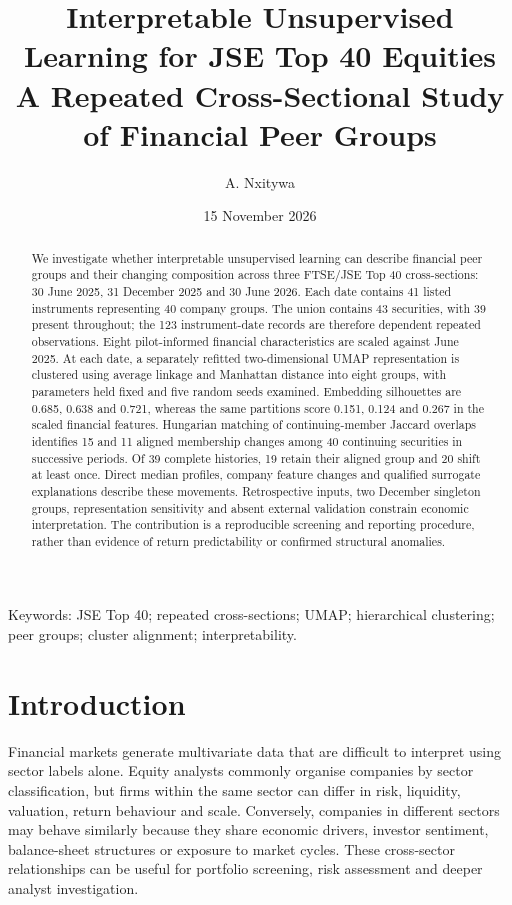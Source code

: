 

\title{Interpretable Unsupervised Learning for JSE Top 40 Equities\\[5pt]\large A Repeated Cross-Sectional Study of Financial Peer Groups}\author{A. Nxitywa}\date{15 November 2026}\maketitle

\begin{abstract}
We investigate whether interpretable unsupervised learning can describe financial peer groups and their changing composition across three FTSE/JSE Top 40 cross-sections: 30 June 2025, 31 December 2025 and 30 June 2026. Each date contains 41 listed instruments representing 40 company groups. The union contains 43 securities, with 39 present throughout; the 123 instrument-date records are therefore dependent repeated observations. Eight pilot-informed financial characteristics are scaled against June 2025. At each date, a separately refitted two-dimensional UMAP representation is clustered using average linkage and Manhattan distance into eight groups, with parameters held fixed and five random seeds examined. Embedding silhouettes are 0.685, 0.638 and 0.721, whereas the same partitions score 0.151, 0.124 and 0.267 in the scaled financial features. Hungarian matching of continuing-member Jaccard overlaps identifies 15 and 11 aligned membership changes among 40 continuing securities in successive periods. Of 39 complete histories, 19 retain their aligned group and 20 shift at least once. Direct median profiles, company feature changes and qualified surrogate explanations describe these movements. Retrospective inputs, two December singleton groups, representation sensitivity and absent external validation constrain economic interpretation. The contribution is a reproducible screening and reporting procedure, rather than evidence of return predictability or confirmed structural anomalies.
\end{abstract}

Keywords: JSE Top 40; repeated cross-sections; UMAP; hierarchical clustering; peer groups; cluster alignment; interpretability.


\FloatBarrier
\section{Introduction}

Financial markets generate multivariate data that are difficult to interpret using sector labels alone. Equity analysts commonly organise companies by sector classification, but firms within the same sector can differ in risk, liquidity, valuation, return behaviour and scale. Conversely, companies in different sectors may behave similarly because they share economic drivers, investor sentiment, balance-sheet structures or exposure to market cycles. These cross-sector relationships can be useful for portfolio screening, risk assessment and deeper analyst investigation.


